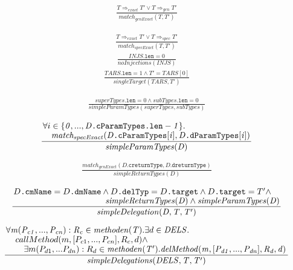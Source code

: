 \documentclass[a4paper,12pt]{article}
\begin{document}
\begin{gather*}
\frac{T \Rightarrow_{exact} T' \vee T \Rightarrow_{gen} T'}{\mathit{match_{genExact}(T,T')}}
\end{gather*}

\begin{gather*}
\frac{T \Rightarrow_{exact} T' \vee T \Rightarrow_{spec} T'}{\mathit{match_{specExact}(T,T')}}
\end{gather*}
\begin{gather*}
\frac{\mathit{INJS}\texttt{.len} = 0}{\mathit{noInjections(INJS)}}
\end{gather*}
\begin{gather*}
\frac{\mathit{TARS}\texttt{.len} = 1 \wedge T' = \mathit{TARS}[0]}{\mathit{singleTarget(TARS,T')}}
\end{gather*}

\begin{gather*}
\frac{\mathit{superTypes}\texttt{.len} = 0 \wedge \mathit{subTypes}\texttt{.len} = 0}{\mathit{simpleParamTypes(superTypes, subTypes)}}
\end{gather*}

\begin{gather*}
\frac{\splitfrac{\forall i \in \mathit{\{0},...,\mathit{D\texttt{.cParamTypes.len}-1\}}.}{\mathit{match_{specExact}(D\texttt{.cParamTypes}[i], D\texttt{.dParamTypes}[i])}}
}
{\mathit{simpleParamTypes(D)}}
\end{gather*}

\begin{gather*}
\frac{\mathit{match_{genExact}(D\texttt{.creturnType}, D\texttt{.dreturnType})} }{\mathit{simpleReturnTypes(D)}}
\end{gather*}

\begin{gather*}
\frac{\splitfrac{D\texttt{.cmName} = D\texttt{.dmName} \wedge D\texttt{.delTyp} = D\texttt{.target} \wedge D\texttt{.target} = T' \wedge}
{\mathit{simpleReturnTypes(D) \wedge \mathit{simpleParamTypes(D)}}}
}{\mathit{simpleDelegation(D,T,T')}}
\end{gather*}


\begin{gather*}
\frac{\splitfrac{\forall \mathit{m(P_{c1},...,P_{cn}):R_c} \in \mathit{methoden(T)}.\exists d \in \mathit{DELS}.}
{\splitfrac{callMethod(m,[P_{c1},...,P_{cn}],R_c,d) \wedge }
{\exists m(P_{d1},...P_{dn}):R_{d} \in \mathit{methoden(T')}.\mathit{delMethod(m,[P_{d1},...,P_{dn}],R_d,d)}
}}}
{\mathit{simpleDelegations(DELS,T,T')}}
\end{gather*}
\end{document}
